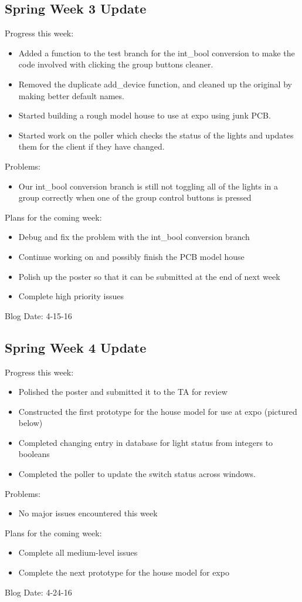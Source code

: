 \subsection{Spring Week 3 Update}
Progress this week:
\begin{itemize}
   \item Added a function to the test branch for the int\_bool conversion to make the code involved with clicking the group buttons cleaner.
   \item Removed the duplicate add\_device function, and cleaned up the original by making better default names.
   \item Started building a rough model house to use at expo using junk PCB.
   \item Started work on the poller which checks the status of the lights and updates them for the client if they have changed.
\end{itemize}
Problems:
\begin{itemize}
   \item Our int\_bool conversion branch is still not toggling all of the lights in a group correctly when one of the group control buttons is pressed
\end{itemize}
Plans for the coming week:
\begin{itemize}
   \item Debug and fix the problem with the int\_bool conversion branch
   \item Continue working on and possibly finish the PCB model house
   \item Polish up the poster so that it can be submitted at the end of next week
   \item Complete high priority issues
\end{itemize}
Blog Date: 4-15-16

\subsection{Spring Week 4 Update}
Progress this week:
\begin{itemize}
   \item Polished the poster and submitted it to the TA for review
   \item Constructed the first prototype for the house model for use at expo (pictured below)
   \item Completed changing entry in database for light status from integers to booleans
   \item Completed the poller to update the switch status across windows.
\end{itemize}
Problems:
\begin{itemize}
   \item No major issues encountered this week
\end{itemize}
Plans for the coming week:
\begin{itemize}
   \item Complete all medium-level issues
   \item Complete the next prototype for the house model for expo
\end{itemize}
Blog Date: 4-24-16

